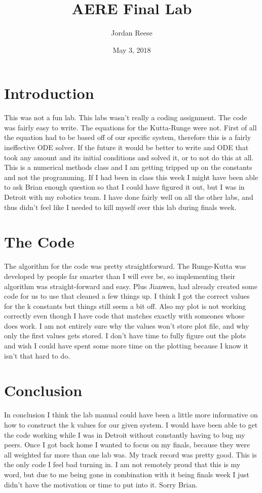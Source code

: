 \documentclass{article}
\title{AERE Final Lab}
\author{Jordan Reese }
\date{May 3, 2018}
\begin{document}
\maketitle



\section*{Introduction}

This was not a fun lab. This labs wasn't really a coding assignment. The code was fairly easy to write. The equations for the Kutta-Runge were not. First of all the equation had to be based off of our specific system, therefore this is a fairly ineffective ODE solver. If the future it would be better to write and ODE that took any amount and its initial conditions and solved it, or to not do this at all. This is a numerical methods class and I am getting tripped up on the constants and not the programming. If I had been in class this week I might have been able to ask Brian enough question so that I could have figured it out, but I was in Detroit with my robotics team. I have done fairly well on all the other labs, and thus didn't feel like I needed to kill myself over this lab during finals week.

\section*{The Code}

The algorithm for the code was pretty straightforward. The Runge-Kutta was developed by people far smarter than I will ever be, so implementing their algorithm was straight-forward and easy. Plus Jianwen, had already created some code for us to use that cleaned a few things up. I think I got the correct values for the k constants but things still seem a bit off. Also my plot is not working correctly even though I have code that matches exactly with someones whose does work. I am not entirely sure why the values won't store plot file, and why only the first values gets stored. I don't have time to fully figure out the plots and wish I could have spent some more time on the plotting because I know it isn't that hard to do. 

\section*{Conclusion}

In conclusion I think the lab manual could have been a little more informative on how to construct the k values for our given system. I would have been able to get the code working while I was in Detroit without constantly having to bug my peers. Once I got back home I wanted to focus on my finals, because they were all weighted far more than one lab was. My track record was pretty good. This is the only code I feel bad turning in. I am not remotely proud that this is my word, but due to me being gone in combination with it being finals week I just didn't have the motivation or time to put into it. Sorry Brian. 
\end{document}
